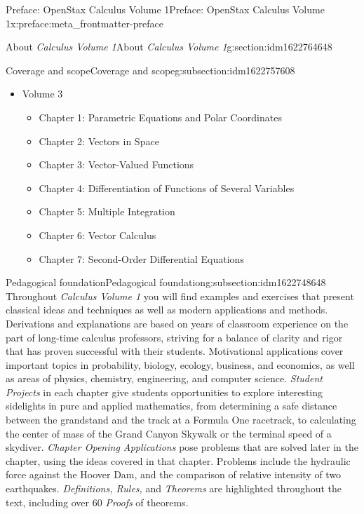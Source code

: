 \documentclass[oneside,10pt,]{book}
\numberwithin{equation}{section}
\begin{document}
\begin{preface}{Preface: OpenStax Calculus Volume 1}{}{Preface: OpenStax Calculus Volume 1}{}{}{x:preface:meta_frontmatter-preface}
\begin{sectionptx}{About \emph{Calculus Volume 1}}{}{About \emph{Calculus Volume 1}}{}{}{g:section:idm1622764648}
\begin{subsectionptx}{Coverage and scope}{}{Coverage and scope}{}{}{g:subsection:idm1622757608}
\begin{itemize}[label=\textbullet]
\item{}Volume 3%
%
\begin{itemize}[label=$\circ$]
\item{}Chapter 1: Parametric Equations and Polar Coordinates%
\item{}Chapter 2: Vectors in Space%
\item{}Chapter 3: Vector-Valued Functions%
\item{}Chapter 4: Differentiation of Functions of Several Variables%
\item{}Chapter 5: Multiple Integration%
\item{}Chapter 6: Vector Calculus%
\item{}Chapter 7: Second-Order Differential Equations%
\end{itemize}
\end{itemize}
\end{subsectionptx}
%
%
\typeout{************************************************}
\typeout{************************************************}
%
\begin{subsectionptx}{Pedagogical foundation}{}{Pedagogical foundation}{}{}{g:subsection:idm1622748648}
Throughout \emph{Calculus Volume 1} you will find examples and exercises that present classical ideas and techniques as well as modern applications and methods. Derivations and explanations are based on years of classroom experience on the part of long-time calculus professors, striving for a balance of clarity and rigor that has proven successful with their students. Motivational applications cover important topics in probability, biology, ecology, business, and economics, as well as areas of physics, chemistry, engineering, and computer science. \emph{Student Projects} in each chapter give students opportunities to explore interesting sidelights in pure and applied mathematics, from determining a safe distance between the grandstand and the track at a Formula One racetrack, to calculating the center of mass of the Grand Canyon Skywalk or the terminal speed of a skydiver. \emph{Chapter Opening Applications} pose problems that are solved later in the chapter, using the ideas covered in that chapter. Problems include the hydraulic force against the Hoover Dam, and the comparison of relative intensity of two earthquakes. \emph{Definitions, Rules,} and \emph{Theorems} are highlighted throughout the text, including over 60 \emph{Proofs} of theorems.%
\end{subsectionptx}
%
%
\typeout{************************************************}

\end{sectionptx}
\end{preface}
\end{document}

